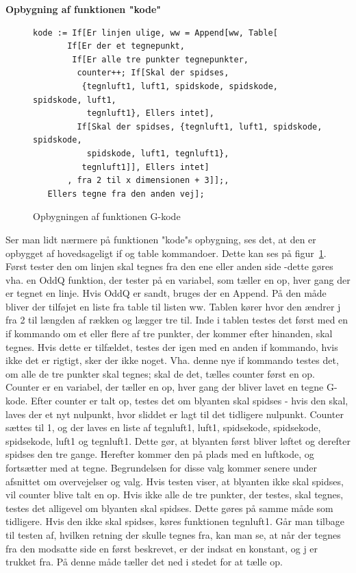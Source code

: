 \textbf{Opbygning af funktionen "kode"}\\
\begin{figure}[h]
	\begin{lstlisting}
kode := If[Er linjen ulige, ww = Append[ww, Table[
       If[Er der et tegnepunkt,
        If[Er alle tre punkter tegnepunkter,
         counter++; If[Skal der spidses,
          {tegnluft1, luft1, spidskode, spidskode, spidskode, luft1, 
           tegnluft1}, Ellers intet],
         If[Skal der spidses, {tegnluft1, luft1, spidskode, spidskode, 
           spidskode, luft1, tegnluft1},
          tegnluft1]], Ellers intet]
       , fra 2 til x dimensionen + 3]];,
   Ellers tegne fra den anden vej];
 \end{lstlisting}
	\caption{Opbygningen af funktionen G-kode}
	\label{fig:opbygninggkode1}
	\end{figure}
Ser man lidt nærmere på funktionen "kode"s opbygning, ses det, at den er opbygget af hovedsageligt if og table kommandoer. Dette kan ses på figur~\ref{fig:opbygninggkode1}. Først tester den om linjen skal tegnes fra den ene eller anden side -dette gøres vha. en OddQ funktion, der tester på en variabel, som tæller en op, hver gang der er tegnet en linje. Hvis OddQ er sandt, bruges der en Append. På den måde bliver der tilføjet en liste fra table til listen ww. Tablen kører hvor den ændrer j fra 2 til længden af rækken og lægger tre til. Inde i tablen testes det først med en if kommando om et eller flere af tre punkter, der kommer efter hinanden, skal tegnes. Hvis dette er tilfældet, testes der igen med en anden if kommando, hvis ikke det er rigtigt, sker der ikke noget. Vha. denne nye if kommando testes det, om alle de tre punkter skal tegnes; skal de det, tælles counter først en op. Counter er en variabel, der tæller en op, hver gang der bliver lavet en tegne G-kode. Efter counter er talt op, testes det om blyanten skal spidses - hvis den skal, laves der et nyt nulpunkt, hvor sliddet er lagt til det tidligere nulpunkt. Counter sættes til 1, og der laves en liste af tegnluft1, luft1, spidsekode, spidsekode, spidsekode, luft1 og tegnluft1. Dette gør, at blyanten først bliver løftet og derefter spidses den tre gange. Herefter kommer den på plads med en luftkode, og fortsætter med at tegne. Begrundelsen for disse valg kommer senere under afsnittet om overvejelser og valg. Hvis testen viser, at blyanten ikke skal spidses, vil counter blive talt en op. Hvis ikke alle de tre punkter, der testes, skal tegnes, testes det alligevel om blyanten skal spidses. Dette gøres på samme måde som tidligere. Hvis den ikke skal spidses, køres funktionen tegnluft1. Går man tilbage til testen af, hvilken retning der skulle tegnes fra, kan man se, at når der tegnes fra den modsatte side en først beskrevet, er der indsat en konstant, og j er trukket fra. På denne måde tæller det ned i stedet for at tælle op.

